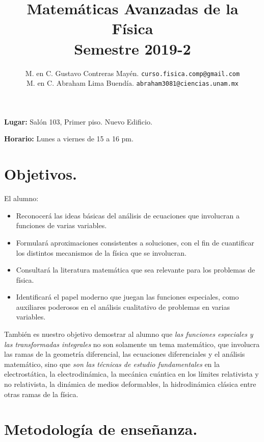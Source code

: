 \documentclass[12pt]{article}
\author{M. en C. Gustavo Contreras Mayén. \texttt{curso.fisica.comp@gmail.com}\\
M. en C. Abraham Lima Buendía. \texttt{abraham3081@ciencias.unam.mx}}
\title{Matemáticas Avanzadas de la Física \\ {\large Semestre 2019-2}}
\date{ }
\begin{document}
\vspace{-4cm}
\renewcommand\labelenumii{\theenumi.{\arabic{enumii}}}
\maketitle
\fontsize{14}{14}\selectfont
\textbf{Lugar: } Salón 103, Primer piso. Nuevo Edificio.
\par
\textbf{Horario: } Lunes a viernes de 15 a 16 pm.
\section{Objetivos.}
El alumno:
\begin{itemize}
\setlength{\itemsep}{0mm}
\item Reconocerá las ideas básicas del análisis de ecuaciones que involucran a funciones de varias variables.
\item Formulará aproximaciones consistentes a soluciones, con el fin de cuantificar los distintos mecanismos de la física que se involucran.
\item Consultará la literatura matemática que sea relevante para los problemas de física.
\item Identificará el papel moderno que juegan las funciones especiales, como auxiliares poderosos en el análisis cualitativo de problemas en varias variables.
\end{itemize}
También es nuestro objetivo demostrar al alumno que \emph{las funciones especiales y las transformadas integrales} no son solamente un tema matemático, que involucra las ramas de la geometría diferencial, las ecuaciones diferenciales y el análisis matemático, sino que \emph{son las técnicas de estudio fundamentales} en la electrostática, la electrodinámica, la mecánica cuántica en los límites relativista y no relativista, la dinámica de medios deformables, la hidrodinámica clásica entre otras ramas de la física.
\section{Metodología de enseñanza.}
\end{document}
